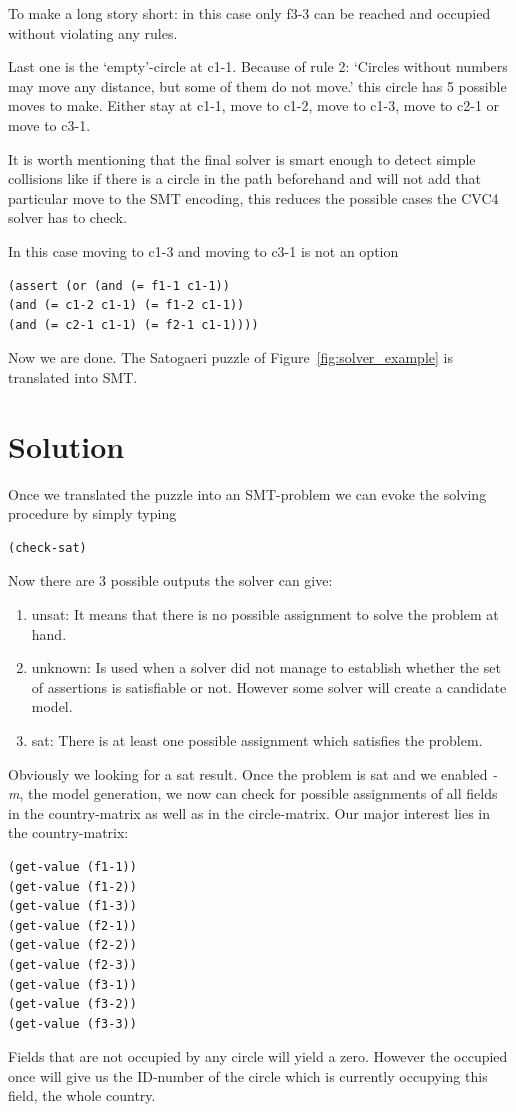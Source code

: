 To make a long story short: in this case only f3-3 can be reached and occupied without violating any rules.

Last one is the `empty'-circle at c1-1. Because of rule 2: `Circles without numbers may move any distance, but some of them do not move.' this circle has 5 possible moves to make. Either stay at c1-1, move to c1-2, move to c1-3, move to c2-1 or move to c3-1. 

It is worth mentioning that the final solver is smart enough to detect simple collisions like if there is a circle in the path beforehand and will not add that particular move to the SMT encoding, this reduces the possible cases the CVC4 solver has to check.

In this case moving to c1-3 and moving to c3-1 is not an option
\begin{lstlisting}
(assert (or (and (= f1-1 c1-1)) 
(and (= c1-2 c1-1) (= f1-2 c1-1))
(and (= c2-1 c1-1) (= f2-1 c1-1))))
\end{lstlisting}
Now we are done. The Satogaeri puzzle of Figure~\ref{fig:solver_example} is translated into SMT.


\section{Solution}
Once we translated the puzzle into an SMT-problem we can evoke the solving procedure by simply typing
\begin{lstlisting}
(check-sat)
\end{lstlisting}
Now there are 3 possible outputs the solver can give:
\begin{enumerate}
  \item unsat: It means that there is no possible assignment to solve the problem at hand.
  \item unknown: Is used when a solver did not manage to establish whether the set of assertions is satisfiable or not. However some solver will create a candidate model.
  \item sat: There is at least one possible assignment which satisfies the problem.
\end{enumerate}
Obviously we looking for a sat result. Once the problem is sat and we enabled \emph{-m}, the model generation, we now can check for possible assignments of all fields in the country-matrix as well as in the circle-matrix. Our major interest lies in the country-matrix:
\begin{lstlisting}
(get-value (f1-1))
(get-value (f1-2))
(get-value (f1-3))
(get-value (f2-1))
(get-value (f2-2))
(get-value (f2-3))
(get-value (f3-1))
(get-value (f3-2))
(get-value (f3-3))
\end{lstlisting}
Fields that are not occupied by any circle will yield a zero. However the occupied once will give us the ID-number of the circle which is currently occupying this field, the whole country.

